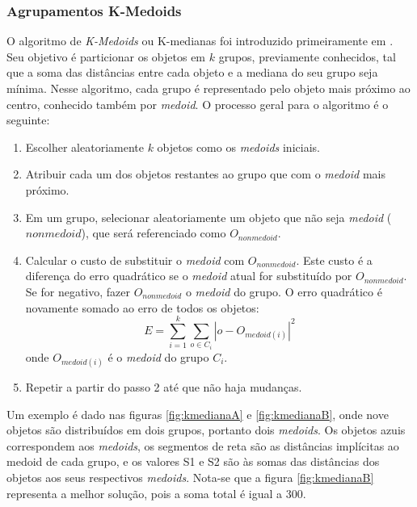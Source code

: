 \subsubsection{Agrupamentos K-Medoids}
O algoritmo de \textit{K-Medoids} ou K-medianas foi introduzido primeiramente em \cite{kaufmann1990}. Seu objetivo é particionar os objetos em ${k}$ grupos, previamente conhecidos, tal que a soma das distâncias entre cada objeto e a mediana do seu grupo seja mínima. Nesse algoritmo, cada grupo é representado pelo objeto mais próximo ao centro, conhecido também por \textit{medoid}.
O processo geral para o algoritmo é o seguinte:
 \begin{enumerate}
 	\item Escolher aleatoriamente ${k}$ objetos como os \textit{medoids} iniciais.
 	\item Atribuir cada um dos objetos restantes ao grupo que com o \textit{medoid} mais próximo.
 	\item Em um grupo, selecionar aleatoriamente um objeto que não seja \textit{medoid} (${nonmedoid}$), que será referenciado como ${O_{nonmedoid}}$.
 	\item Calcular o custo de substituir o \textit{medoid} com ${O_{nonmedoid}}$. Este custo é a diferença do erro quadrático se o \textit{medoid} atual for substituído por ${O_{nonmedoid}}$. Se for negativo, fazer ${O_{nonmedoid}}$ o \textit{medoid} do grupo. O erro quadrático é novamente somado ao erro de todos os objetos:
 	\begin{equation}
 	E = \sum_{i=1}^{k}\sum_{o\in C_{i}} |o - O_{medoid(i)}|^{2}
 	\end{equation}
 	onde ${O_{medoid(i)}}$ é o \textit{medoid} do grupo ${C_{i}}$.
 	\item Repetir a partir do passo 2 até que não haja mudanças. 
 \end{enumerate}

Um exemplo é dado nas figuras \ref{fig:kmedianaA} e \ref{fig:kmedianaB}, onde nove objetos são distribuídos em dois grupos, portanto dois \textit{medoids}. Os objetos azuis correspondem aos \textit{medoids}, os segmentos de reta são as distâncias implícitas ao medoid de cada grupo, e os valores S1 e S2 são às somas das distâncias dos objetos aos seus respectivos \textit{medoids}. Nota-se que a figura \ref{fig:kmedianaB} representa a melhor solução, pois a soma total é igual a 300.

